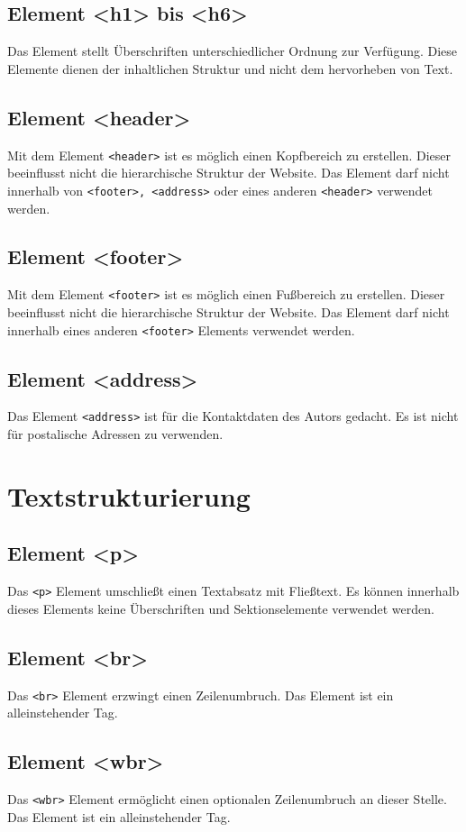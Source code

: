 \subsection{Element <h1> bis <h6>}
Das Element stellt Überschriften unterschiedlicher Ordnung zur Verfügung. Diese Elemente dienen der inhaltlichen Struktur und nicht dem hervorheben von Text.
\subsection{Element <header>}
Mit dem Element \texttt{<header>} ist es möglich einen Kopfbereich zu erstellen. Dieser beeinflusst nicht die hierarchische Struktur der Website. Das Element darf nicht innerhalb von \texttt{<footer>, <address>} oder eines anderen \texttt{<header>} verwendet werden.
\subsection{Element <footer>}
Mit dem Element \texttt{<footer>} ist es möglich einen Fußbereich zu erstellen. Dieser beeinflusst nicht die hierarchische Struktur der Website. Das Element darf nicht innerhalb eines anderen \texttt{<footer>} Elements verwendet werden.
\subsection{Element <address>}
Das Element \texttt{<address>} ist für die Kontaktdaten des Autors gedacht. Es ist nicht für postalische Adressen zu verwenden.
\section{Textstrukturierung}
\subsection{Element <p>}
Das \texttt{<p>} Element umschließt einen Textabsatz mit Fließtext. Es können innerhalb dieses Elements keine Überschriften und Sektionselemente verwendet werden.
\subsection{Element <br>}
Das \texttt{<br>} Element erzwingt einen Zeilenumbruch. Das Element ist ein alleinstehender Tag.
\subsection{Element <wbr>}
Das \texttt{<wbr>} Element ermöglicht  einen optionalen Zeilenumbruch an dieser Stelle. Das Element ist ein alleinstehender Tag.
